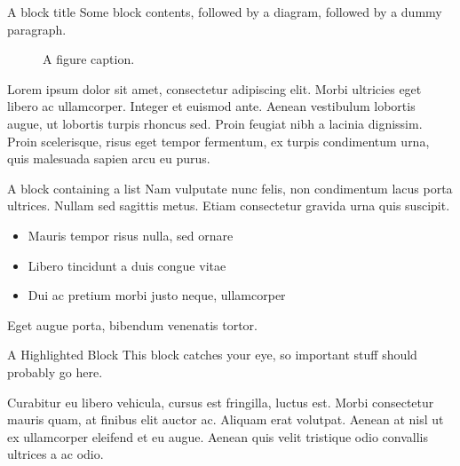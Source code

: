\documentclass[final]{beamer}
\newlength{\sepwidth}
\newlength{\colwidth}
\newcommand{\separatorcolumn}{\begin{column}{\sepwidth}\end{column}}
\begin{document}
\begin{frame}[label={sec:orgc24fd89}]{}
\begin{block}{}
\separatorcolumn

\begin{columns}
\begin{column}{\colwidth\columnwidth}
\begin{block}{A block title}
Some block contents, followed by a diagram, followed by a dummy paragraph.

\begin{figure}
  \centering
  \caption{A figure caption.}
\end{figure}

Lorem ipsum dolor sit amet, consectetur adipiscing elit. Morbi ultricies eget
libero ac ullamcorper. Integer et euismod ante. Aenean vestibulum lobortis
augue, ut lobortis turpis rhoncus sed. Proin feugiat nibh a lacinia
dignissim. Proin scelerisque, risus eget tempor fermentum, ex turpis condimentum
urna, quis malesuada sapien arcu eu purus.
\end{block}

\begin{block}{A block containing a list}
Nam vulputate nunc felis, non condimentum lacus porta ultrices. Nullam sed
sagittis metus. Etiam consectetur gravida urna quis suscipit.

\begin{itemize}
\item \alert{Mauris tempor} risus nulla, sed ornare
\item \alert{Libero tincidunt} a duis congue vitae
\item \alert{Dui ac pretium} morbi justo neque, ullamcorper
\end{itemize}

Eget augue porta, bibendum venenatis tortor.
\end{block}

\begin{alertblock}{A Highlighted Block}
This block catches your eye, so \alert{important stuff} should probably go
here.

Curabitur eu libero vehicula, cursus est fringilla, luctus est. Morbi
consectetur mauris quam, at finibus elit auctor ac. Aliquam erat volutpat.
Aenean at nisl ut ex ullamcorper eleifend et eu augue. Aenean quis velit
tristique odio convallis ultrices a ac odio.


\end{alertblock}
\end{column}
\end{columns}
\end{block}
\end{frame}
\end{document}
